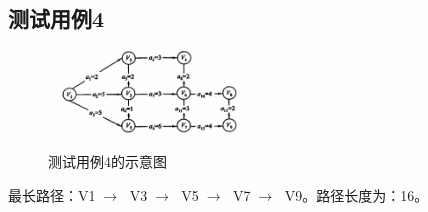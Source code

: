 \documentclass{article}
\begin{document}
\subsection{测试用例4}
\begin{figure}[H]
	\centering
	{\includegraphics[width=0.5\textwidth]{example4.png}} 
	\caption{测试用例4的示意图} 
\end{figure}
最长路径：V1$\;\longrightarrow \; $ V3$\;\longrightarrow \; $ V5$\;\longrightarrow \; $ V7$\;\longrightarrow \; $ V9。路径长度为：16。
\end{document}
